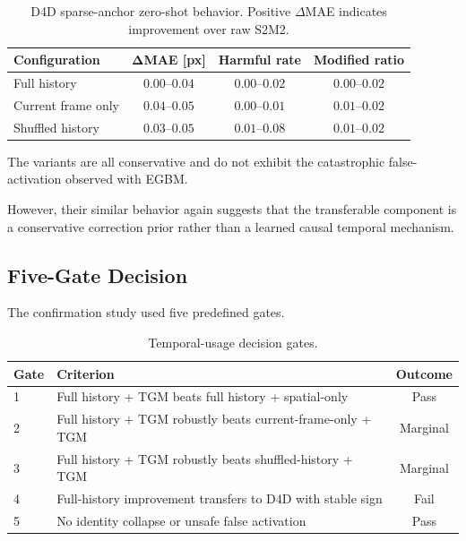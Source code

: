 \documentclass[11pt,a4paper]{article}
\begin{document}
\begin{table}[h]
\centering
\caption{D4D sparse-anchor zero-shot behavior. Positive $\Delta$MAE indicates
improvement over raw S2M2.}
\small
\begin{tabular}{lccc}
\toprule
\textbf{Configuration}
& $\boldsymbol{\Delta}$\textbf{MAE [px]}
& \textbf{Harmful rate}
& \textbf{Modified ratio} \\
\midrule
Full history
& $0.00$--$0.04$
& $0.00$--$0.02$
& $0.00$--$0.02$ \\

Current frame only
& $0.04$--$0.05$
& $0.00$--$0.01$
& $0.01$--$0.02$ \\

Shuffled history
& $0.03$--$0.05$
& $0.01$--$0.08$
& $0.01$--$0.02$ \\
\bottomrule
\end{tabular}
\end{table}

The variants are all conservative and do not exhibit the catastrophic
false-activation observed with EGBM.

However, their similar behavior again suggests that the transferable component is
a conservative correction prior rather than a learned causal temporal mechanism.

\subsection{Five-Gate Decision}

The confirmation study used five predefined gates.

\begin{table}[h]
\centering
\caption{Temporal-usage decision gates.}
\small
\begin{tabular}{lp{7cm}c}
\toprule
\textbf{Gate}
& \textbf{Criterion}
& \textbf{Outcome} \\
\midrule
1
& Full history + TGM beats full history + spatial-only
& Pass \\

2
& Full history + TGM robustly beats current-frame-only + TGM
& Marginal \\

3
& Full history + TGM robustly beats shuffled-history + TGM
& Marginal \\

4
& Full-history improvement transfers to D4D with stable sign
& Fail \\

5
& No identity collapse or unsafe false activation
& Pass \\
\bottomrule
\end{tabular}
\end{table}
\end{document}
